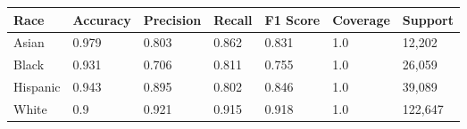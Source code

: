 \begin{tabular}{lllllll}
\toprule
Race & Accuracy & Precision & Recall & F1 Score & Coverage & Support \\
\midrule
Asian & 0.979 & 0.803 & 0.862 & 0.831 & 1.0 & 12,202 \\
Black & 0.931 & 0.706 & 0.811 & 0.755 & 1.0 & 26,059 \\
Hispanic & 0.943 & 0.895 & 0.802 & 0.846 & 1.0 & 39,089 \\
White & 0.9 & 0.921 & 0.915 & 0.918 & 1.0 & 122,647 \\
\bottomrule
\end{tabular}
